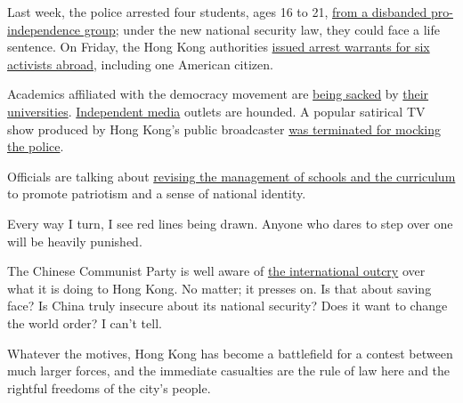 Last week, the police arrested four students, ages 16 to 21,
\href{https://www.scmp.com/news/hong-kong/law-and-crime/article/3095240/least-three-core-members-hong-kong-pro-independence}{from
a disbanded pro-independence group}; under the new national security
law, they could face a life sentence. On Friday, the Hong Kong
authorities
\href{https://www.nytimes3xbfgragh.onion/reuters/2020/07/31/world/asia/31reuters-hongkong-security-exiles.html?searchResultPosition=9}{issued
arrest warrants for six activists abroad}, including one American
citizen.

Academics affiliated with the democracy movement are
\href{https://www.nytimes3xbfgragh.onion/2020/07/28/world/asia/benny-tai-hong-kong-university.html?campaign_id=7\&emc=edit_MBAE_p_20200728\&instance_id=20720\&nl=morning-briefing\&regi_id=65413713\&section=whatElse\&segment_id=34578\&te=1\&user_id=bd32fbf008e5183a7928ed61}{being
sacked} by
\href{https://www.scmp.com/news/hong-kong/politics/article/3046632/occupy-ringleader-shiu-ka-chun-accuses-hong-kong-university}{their
universities}.
\href{https://www.scmp.com/news/hong-kong/law-and-crime/article/3092957/hong-kong-media-tycoon-jimmy-lai-and-12-others-face}{Independent
media} outlets are hounded. A popular satirical TV show produced by Hong
Kong's public broadcaster
\href{https://hongkongfp.com/2020/05/19/hong-kong-public-broadcaster-axes-satirical-show-hours-after-govt-demands-apology-for-insulting-police/}{was
terminated for mocking the police}.

Officials are talking about
\href{https://www.scmp.com/news/hong-kong/education/article/3095434/hong-kong-national-security-law-schools-get-new-teaching}{revising
the management of schools and the curriculum} to promote patriotism and
a sense of national identity.

Every way I turn, I see red lines being drawn. Anyone who dares to step
over one will be heavily punished.

The Chinese Communist Party is well aware of
\href{https://www.state.gov/on-the-postponement-of-hong-kongs-legislative-council-elections/}{the
international outcry} over what it is doing to Hong Kong. No matter; it
presses on. Is that about saving face? Is China truly insecure about its
national security? Does it want to change the world order? I can't tell.

Whatever the motives, Hong Kong has become a battlefield for a contest
between much larger forces, and the immediate casualties are the rule of
law here and the rightful freedoms of the city's people.

